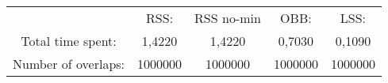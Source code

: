 \begin{tabular}{c|c|c|c|c}\\ 
& RSS: & RSS no-min & OBB: & LSS:\\ 
Total time spent: & 1,4220 & 1,4220 & 0,7030 & 0,1090\\ 
Number of overlaps: &1000000 & 1000000 & 1000000 & 1000000\\ 
\end{tabular}